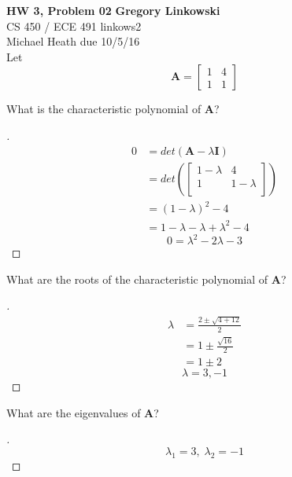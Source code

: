 \documentclass[12pt]{article}
\newenvironment{exercise}[2][Exercise]{\begin{trivlist}
\item[\hskip \labelsep {\bfseries #1}\hskip \labelsep {\bfseries #2.}]}{\end{trivlist}}
\begin{document}
\noindent
\large\textbf{HW 3, Problem 02} \hfill \textbf{Gregory Linkowski} \\
\normalsize CS 450 / ECE 491 \hfill linkows2 \\
Michael Heath \hfill due 10/5/16 \\



\vspace{5mm}
Let	\[ \bm{A}=\begin{bmatrix}	1 & 4 \\ 1 & 1	\end{bmatrix}	\]  
\vspace{5mm}

\begin{exercise}{1}
	What is the characteristic polynomial of $\bm{A}$?
\end{exercise}
\begin{proof}[]
	\vspace{-8mm}
	\begin{align*}
		0 &= det(\bm{A} - \lambda \bm{I}) \\
		&= det\left( \begin{bmatrix} 1-\lambda & 4 \\ 1 & 1-\lambda \\ \end{bmatrix} \right) \\
		&= (1-\lambda)^2 - 4 \\
		&= 1 - \lambda - \lambda + \lambda^2 - 4
	\end{align*}
	\[\boxed{ 0 = \lambda^2 - 2 \lambda - 3 }\] 
\end{proof}

\begin{exercise}{2}
	What are the roots of the characteristic polynomial of $\bm{A}$?
\end{exercise}
\begin{proof}[]
	\vspace{-8mm}
	\begin{align*}
		\lambda &= \frac{2 \pm \sqrt{4 + 12}}{2} \\
		&= 1 \pm \frac{\sqrt{16}}{2} \\
		&= 1 \pm 2 
	\end{align*}
	\[\boxed{ \lambda = 3, -1 }\] 
\end{proof}
\begin{exercise}{3}
	What are the eigenvalues of $\bm{A}$?
\end{exercise}
\begin{proof}[]
	\[\boxed{ \lambda_1 = 3, \; \lambda_2 = -1 }\] 	
\end{proof}
\end{document}
